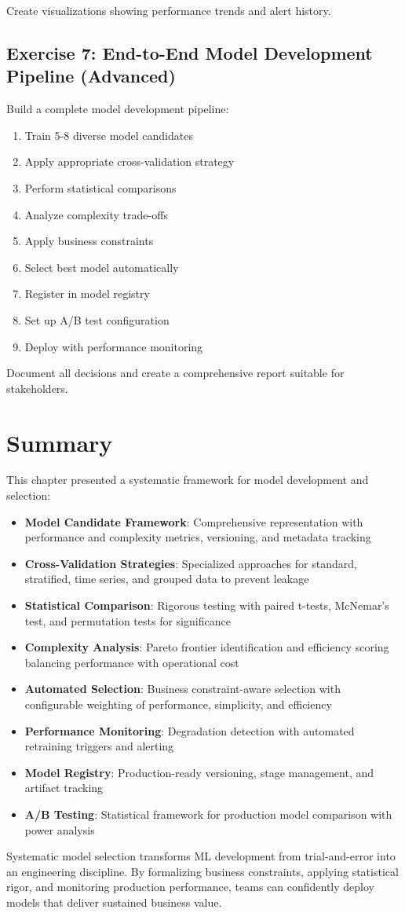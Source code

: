 Create visualizations showing performance trends and alert history.

\subsection{Exercise 7: End-to-End Model Development Pipeline (Advanced)}

Build a complete model development pipeline:

\begin{enumerate}
    \item Train 5-8 diverse model candidates
    \item Apply appropriate cross-validation strategy
    \item Perform statistical comparisons
    \item Analyze complexity trade-offs
    \item Apply business constraints
    \item Select best model automatically
    \item Register in model registry
    \item Set up A/B test configuration
    \item Deploy with performance monitoring
\end{enumerate}

Document all decisions and create a comprehensive report suitable for stakeholders.

\section{Summary}

This chapter presented a systematic framework for model development and selection:

\begin{itemize}
    \item \textbf{Model Candidate Framework}: Comprehensive representation with performance and complexity metrics, versioning, and metadata tracking
    \item \textbf{Cross-Validation Strategies}: Specialized approaches for standard, stratified, time series, and grouped data to prevent leakage
    \item \textbf{Statistical Comparison}: Rigorous testing with paired t-tests, McNemar's test, and permutation tests for significance
    \item \textbf{Complexity Analysis}: Pareto frontier identification and efficiency scoring balancing performance with operational cost
    \item \textbf{Automated Selection}: Business constraint-aware selection with configurable weighting of performance, simplicity, and efficiency
    \item \textbf{Performance Monitoring}: Degradation detection with automated retraining triggers and alerting
    \item \textbf{Model Registry}: Production-ready versioning, stage management, and artifact tracking
    \item \textbf{A/B Testing}: Statistical framework for production model comparison with power analysis
\end{itemize}

Systematic model selection transforms ML development from trial-and-error into an engineering discipline. By formalizing business constraints, applying statistical rigor, and monitoring production performance, teams can confidently deploy models that deliver sustained business value.
